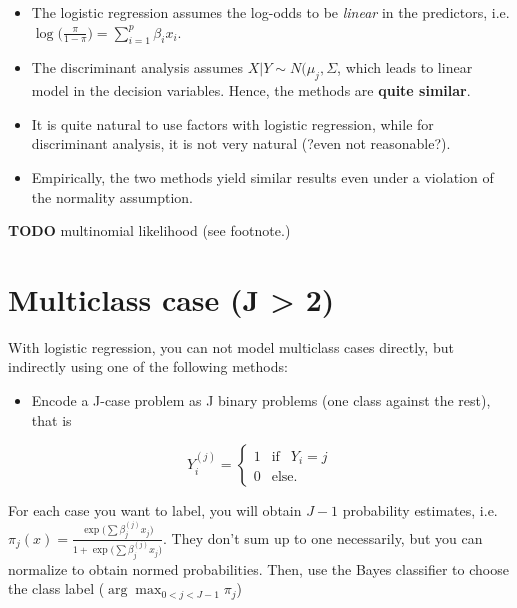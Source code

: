 \documentclass[]{book}
\providecommand{\tightlist}{%
  \setlength{\itemsep}{0pt}\setlength{\parskip}{0pt}}
\begin{document}
\begin{itemize}
\tightlist
\item
  The logistic regression assumes the log-odds to be \emph{linear} in
  the predictors, i.e.
  \(\log\Big(\frac{\pi}{1-\pi}\Big) = \sum\limits_{i = 1}^p \beta_i x_i\).
\item
  The discriminant analysis assumes \(X|Y \sim N(\mu_j, \Sigma\), which
  leads to linear model in the decision variables. Hence, the methods
  are \textbf{quite similar}.
\item
  It is quite natural to use factors with logistic regression, while for
  discriminant analysis, it is not very natural (?even not reasonable?).
\item
  Empirically, the two methods yield similar results even under a
  violation of the normality assumption.
\end{itemize}

\textbf{TODO} multinomial likelihood (see footnote.)

\section{Multiclass case (J \textgreater{}
2)}\label{multiclass-case-j-2}

With logistic regression, you can not model multiclass cases directly,
but indirectly using one of the following methods:

\begin{itemize}
\tightlist
\item
  Encode a J-case problem as J binary problems (one class against the
  rest), that is
\end{itemize}

\begin{equation}
  Y_i^{(j)} = \begin{cases}
        1 \;\;\ \text{if} \;\;\ Y_i = j
        \\
        0 \;\;\ \text{else}.
        \end{cases}
 \end{equation}

For each case you want to label, you will obtain \(J-1\) probability
estimates, i.e.
\(\pi_j(x) = \frac{\exp\big(\sum\beta^{(j)}_jx_j\big)}{1 + \exp\big(\sum\beta^{(j)}_jx_j\big)}\).
They don't sum up to one necessarily, but you can normalize to obtain
normed probabilities. Then, use the Bayes classifier to choose the class
label (\(\arg\max_{0 < j < J-1} \pi_j\))
\end{document}
